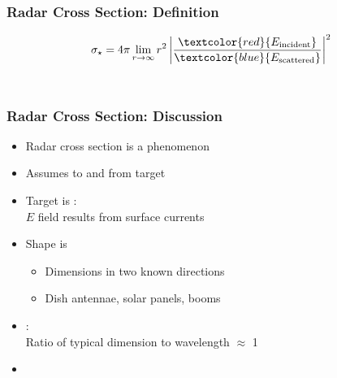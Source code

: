 \begin{frame}\frametitle{Radar Cross Section: Definition}
	\begin{equation}
		\sigma_{\star} = 4\pi\lim\limits_{r\to\infty} r^{2} \left|\frac{\textcolor{red}{E_{\text{incident}}}}{\textcolor{blue}{E_{\text{scattered}}}}\right|^{2}
	\end{equation}
	\\[20pt]
	\cite[(2.36)]{skolnik1962introduction}	
\end{frame}
\begin{frame}\frametitle{Radar Cross Section: Discussion}
	\begin{itemize}
		\item Radar cross section is a {} phenomenon
		\item Assumes {} to and from target
		\item Target is {}: \\$E$ field results from surface currents
		\item Shape is {}
			\begin{itemize}
				\item Dimensions in two known directions
				\item Dish antennae, solar panels, booms
			\end{itemize}
		\item {}: \\Ratio of typical dimension to wavelength $\approx$ 1 
		\item \cite[\S 4.6]{kolosov1987}
	\end{itemize}	
\end{frame}

